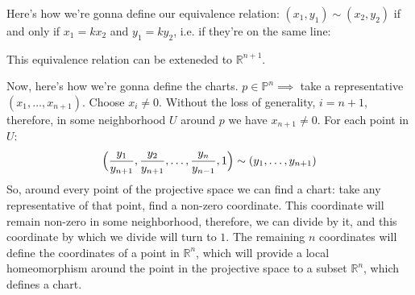 \begin{enumerate}
{        Here's how we're gonna define our equivalence relation:
        $(x_1, y_1) \sim (x_2, y_2)$ if and only if $x_1 = kx_2$ and $y_1 = ky_2$,
        i.e. if they're on the same line:
        \begin{center}   
        \end{center}
        This equivalence relation can be exteneded to $\mathbb{R}^{n+1}$.

        Now, here's how we're gonna define the charts.
        $p \in \mathbb{P}^n \implies$ take a representative
        $(x_1, \dots, x_{n+1})$. Choose $x_i \ne 0$.
        Without the loss of generality, $i = n + 1$, therefore, in some
        neighborhood $U$ around $p$ we have $x_{n + 1} \ne 0$.
        For each point in $U$:
        \[
            \Bigl(\frac{y_1}{y_{n+1}}, \frac{y_2}{y_{n+1}}, \dots, \frac{y_n}{y_{n - 1}}, 1\Bigr)
            \sim (y_1, \dots, y_{n + 1})
        \]
        So, around every point of the projective space we can find a chart:
        take any representative of that point, find a non-zero coordinate.
        This coordinate will remain non-zero in some neighborhood, therefore,
        we can divide by it, and this coordinate by which we divide 
        will turn to $1$. The remaining $n$ coordinates will define the coordinates of a point
        in $\mathbb{R}^n$, which will provide a local homeomorphism around
        the point in the projective space to a subset $\mathbb{R}^n$, 
        which defines a chart.
    }
\end{enumerate}